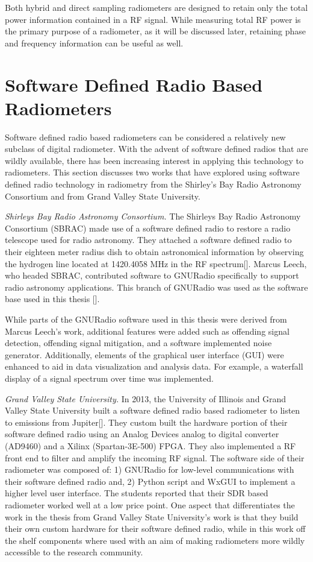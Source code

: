 Both hybrid and direct sampling radiometers are designed to retain only the total power information contained in a RF signal.  While measuring total RF power is the primary purpose of a radiometer, as it will be discussed later, retaining phase and frequency information can be useful as well.

\section{Software Defined Radio Based Radiometers}

Software defined radio based radiometers can be considered a relatively new subclass of digital radiometer.  With the advent of software defined radios that are wildly available, there has been increasing interest in applying this technology to radiometers.  This section discusses two works that have explored using software defined radio technology in radiometry from the Shirley's Bay Radio Astronomy Consortium and from Grand Valley State University.

\emph{Shirleys Bay Radio Astronomy Consortium.}  The Shirleys Bay Radio Astronomy Consortium (SBRAC) made use of a software defined radio to restore a radio telescope used for radio astronomy.  They attached a software defined radio to their eighteen meter radius dish to obtain astronomical information by observing the hydrogen line located at 1420.4058 MHz in the RF spectrum[\cite{Leech2007}].  Marcus Leech, who headed SBRAC, contributed software to GNURadio specifically to support radio astronomy applications.  This branch of GNURadio was used as the software base used in this thesis [\cite{Leech}].

While parts of the GNURadio software used in this thesis were derived from Marcus Leech's work, additional features were added such as offending signal detection, offending signal mitigation, and a software implemented noise generator.  Additionally, elements of the graphical user interface (GUI) were enhanced to aid in data visualization and analysis data.  For example, a waterfall display of a signal spectrum over time was implemented.

\emph{Grand Valley State University.}  In 2013, the University of Illinois and Grand Valley State University built a software defined radio based radiometer to listen to emissions from Jupiter[\cite{Behnke}].  They custom built the hardware portion of their software defined radio using an Analog Devices analog to digital converter (AD9460) and a Xilinx (Spartan-3E-500) FPGA.  They also implemented a RF front end to filter and amplify the incoming RF signal.  The software side of their radiometer was composed of: 1) GNURadio for low-level communications with their software defined radio and, 2) Python script and WxGUI to implement a higher level user interface.  The students reported that their SDR based radiometer worked well at a low price point.  One aspect that differentiates the work in the thesis from Grand Valley State University's work is that they build their own custom hardware for their software defined radio, while in this work off the shelf components where used with an aim of making radiometers more wildly accessible to the research community.

